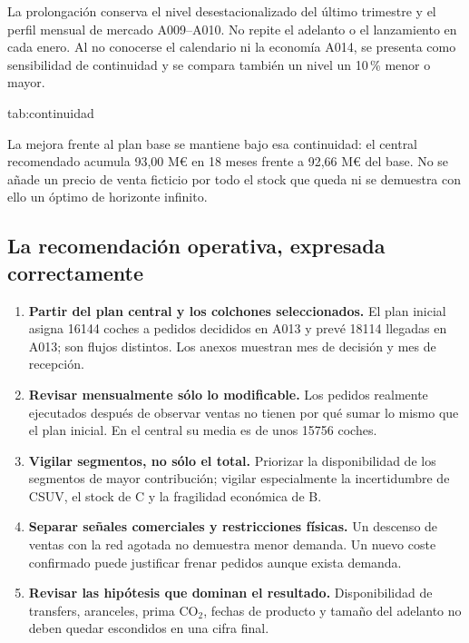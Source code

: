 La prolongación conserva el nivel desestacionalizado del último trimestre y el
perfil mensual de mercado A009--A010. No repite el adelanto o el lanzamiento en
cada enero. Al no conocerse el calendario ni la economía A014, se presenta como
sensibilidad de continuidad y se compara también un nivel un 10\,\% menor o mayor.

{tab:continuidad}{}

La mejora frente al plan base se mantiene bajo esa continuidad: el central
recomendado acumula 93,00 M\euro{} en 18 meses frente a 92,66 M\euro{} del base.
No se añade un precio de venta ficticio por todo el stock que queda ni se
demuestra con ello un óptimo de horizonte infinito.

\subsection{La recomendación operativa, expresada correctamente}
\begin{enumerate}
\item \textbf{Partir del plan central y los colchones seleccionados.} El plan
inicial asigna \num{16144} coches a pedidos decididos en A013 y prevé
\num{18114} llegadas en A013; son flujos distintos. Los anexos muestran mes de
decisión y mes de recepción.
\item \textbf{Revisar mensualmente sólo lo modificable.} Los pedidos realmente
ejecutados después de observar ventas no tienen por qué sumar lo mismo que el
plan inicial. En el central su media es de unos \num{15756} coches.
\item \textbf{Vigilar segmentos, no sólo el total.} Priorizar la disponibilidad
de los segmentos de mayor contribución; vigilar especialmente la incertidumbre
de CSUV, el stock de C y la fragilidad económica de B.
\item \textbf{Separar señales comerciales y restricciones físicas.} Un descenso
de ventas con la red agotada no demuestra menor demanda. Un nuevo coste confirmado
puede justificar frenar pedidos aunque exista demanda.
\item \textbf{Revisar las hipótesis que dominan el resultado.} Disponibilidad de
transfers, aranceles, prima CO$_2$, fechas de producto y tamaño del adelanto no
deben quedar escondidos en una cifra final.
\end{enumerate}

